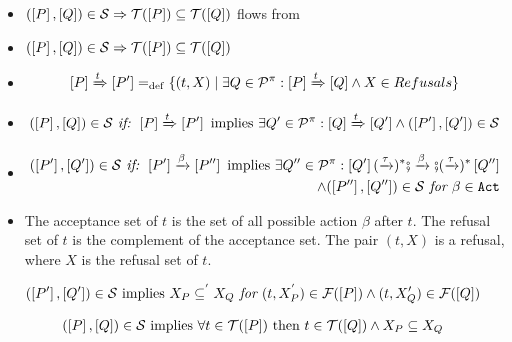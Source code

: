 \begin{prf}

\begin{itemize}
\item $(\ec{P},\ec{Q})\in{}\simu  \Rightarrow  \traces[P]\subseteq\traces[Q]$ flows from 
\item $(\ec{P},\ec{Q})\in{}\simu  \Rightarrow  \traces[P]\subseteq\traces[Q]$
\item \begin{align}
    \left[P\right]\xRightarrow{t}\left[P'\right] =_{\mathrm{def}} \{(t,X) \mid \exists Q\in\mathcal P^{\pi}: \left[P\right] \xRightarrow{t} \left[Q\right]\wedge X\in Refusals\}
\label{failure}
\end{align}
\item 
\begin{align*}
	(\left[P\right],\left[Q\right])\in\mathcal{S} \textit{ if: } \left[P\right]\xRightarrow{t}\left[P'\right] \text{ implies } \exists{}Q'\in\mathcal P^{\pi}:\left[Q\right]\xRightarrow{t}\left[Q'\right] \wedge (\left[P'\right],\left[Q'\right])\in\mathcal{S}
\end{align*}

\item 
\begin{align}
(\left[P'\right],\left[Q'\right])\in\mathcal{S} \textit{ if: }\left[P'\right]\xrightarrow{\beta}\left[P''\right] \text{ implies } \exists{}Q''\in\mathcal P^{\pi}:\left[Q'\right](\xrightarrow{\tau})^*\fatsemi\xrightarrow{\beta}\fatsemi(\xrightarrow{\tau})^*\left[Q''\right] \\  \wedge (\left[P''\right],\left[Q''\right])\in\mathcal{S}\textit{ for }\beta\in\mathtt{Act}
\end{align}

\item The acceptance set of $t$ is the set of all possible action $\beta$ after $t$. The refusal set of $t$ is the complement of the acceptance set. The pair $(t,X)$ is a refusal, where $X$ is the refusal set of $t$.
\end{itemize}

\item 
\begin{align*}
	(\ec{P'},\ec{Q'})\in\simu \text{ implies } X_P\subseteq^{'}X_Q \textit{ for } (t,X_P^{'}) \in\failures[P] \wedge (t,X_Q') \in\failures[Q]
\end{align*}

\item 
\begin{align*}
	(\ec{P},\ec{Q})\in\simu \text{ implies } \forall t \in\traces[P] \text{ then } t \in  \traces[Q] \wedge X_P \subseteq X_Q
\end{align*}


\end{prf}